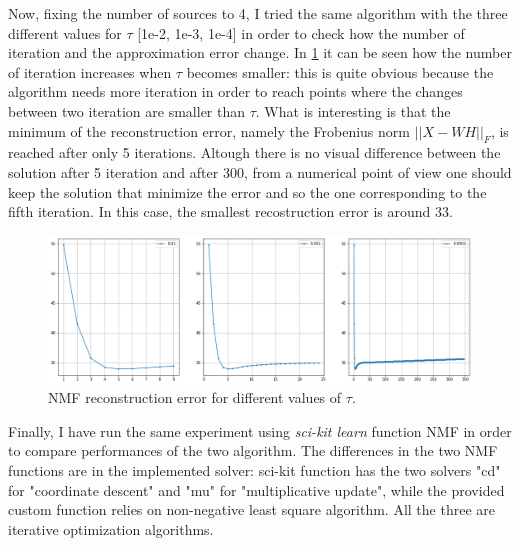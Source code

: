 \documentclass[a4paper,10pt]{report}
\begin{document}
Now, fixing the number of sources to 4, I tried the same algorithm with the three different values for $\tau$ [1e-2, 1e-3, 1e-4] in order to check how the number of iteration and the approximation error change.
In \ref{fig:nmf_err} it can be seen how the number of iteration increases when $\tau$ becomes smaller: this is quite obvious because the algorithm needs more iteration in order to reach points where the changes between two iteration are smaller than $\tau$.
What is interesting is that the minimum of the reconstruction error, namely the Frobenius norm $||X-WH||_F$, is reached after only 5 iterations. Altough there is no visual difference between the solution after 5 iteration and after 300, from a numerical point of view one should keep the solution that minimize the error and so the one corresponding to the fifth iteration.
In this case, the smallest recostruction error is around 33. 
\begin{figure}[h]
    \center
    \includegraphics[width=1\linewidth]{nmf_err.png}
    \caption{NMF reconstruction error for different values of $\tau$.}
    \label{fig:nmf_err}
  \end{figure}

Finally, I have run the same experiment using \emph{sci-kit learn} function NMF in order to compare performances of the two algorithm.
The differences in the two NMF functions are in the implemented solver: sci-kit function has the two solvers "cd" for "coordinate descent" and "mu" for "multiplicative update", while the provided custom function relies on non-negative least square algorithm.
All the three are iterative optimization algorithms. 
\end{document}

